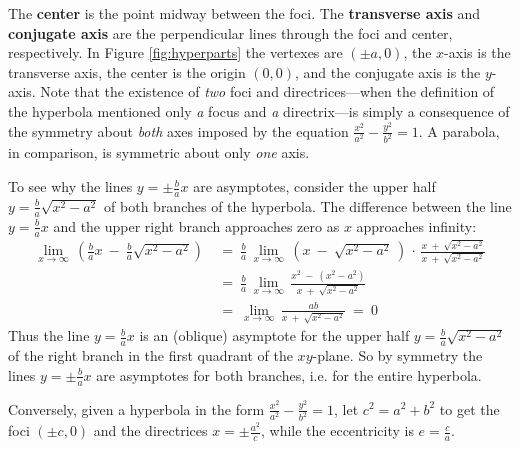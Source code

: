 \noindent The \textbf{center} is the point midway
between the foci. The \textbf{transverse axis} and
 \textbf{conjugate axis}
are the perpendicular lines through the foci and center,
respectively.
\newpage
In Figure \ref{fig:hyperparts} the vertexes are $(\pm a,0)$, the $x$-axis is the
transverse axis, the center is the origin $(0,0)$, and the conjugate axis is the
$y$-axis.
Note that the existence of \emph{two} foci and directrices---when the definition
of the hyperbola mentioned only \emph{a} focus and \emph{a} directrix---is
simply a consequence of the symmetry about \emph{both} axes imposed by the
equation $\frac{x^2}{a^2} - \frac{y^2}{b^2} = 1$. A parabola, in comparison,
is symmetric about only \emph{one} axis.

To see why the lines $y=\pm \frac{b}{a}x$ are asymptotes, consider the upper
half $y=\frac{b}{a}\sqrt{x^2 - a^2}$ of both branches of the hyperbola. The
difference between the line $y=\frac{b}{a}x$ and the upper right branch
approaches zero as $x$ approaches infinity:
\begin{align*}
\lim_{x \to \infty} \,\left(\frac{b}{a}x ~-~ \frac{b}{a}\sqrt{x^2 - a^2}\right) ~&=~
 \frac{b}{a}\,\lim_{x \to \infty} \,\left(x ~-~ \sqrt{x^2 - a^2}\,\right) \,\cdot\,
 \frac{x ~+~ \sqrt{x^2 - a^2}}{x ~+~ \sqrt{x^2 - a^2}}\\[4pt]
&=~ \frac{b}{a}\,\lim_{x \to \infty} \,\frac{x^2 ~-~ (x^2 - a^2)}{x ~+~ \sqrt{x^2 - a^2}}\\[4pt]
&=~ \lim_{x \to \infty} \,\frac{ab}{x ~+~ \sqrt{x^2 - a^2}} ~=~ 0
\end{align*}
Thus the line $y=\frac{b}{a}x$ is an (oblique) asymptote for the upper half
$y=\frac{b}{a}\sqrt{x^2 - a^2}$ of the right branch in the first quadrant of
the $xy$-plane. So by symmetry the lines $y=\pm \frac{b}{a}x$ are asymptotes for
both branches, i.e. for the entire hyperbola.

Conversely, given a hyperbola in the form
$\frac{x^2}{a^2} - \frac{y^2}{b^2} = 1$, let $c^2=a^2+b^2$ to get the foci
$(\pm c,0)$ and the directrices $x=\pm\frac{a^2}{c}$, while the eccentricity is
$e = \frac{c}{a}$.

